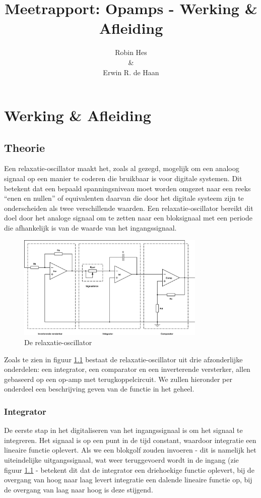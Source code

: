\documentclass{report}
\title{Meetrapport: Opamps - Werking \& Afleiding}
\author{Robin Hes\\\&\\Erwin R. de Haan}
\begin{document}
\chapter{Werking \& Afleiding}

\section{Theorie}
Een relaxatie-oscillator maakt het, zoals al gezegd, mogelijk om een analoog signaal op een manier te coderen die bruikbaar is voor digitale systemen. Dit betekent dat een bepaald spanningsniveau moet worden omgezet naar een reeks ``enen en nullen'' of equivalenten daarvan die door het digitale systeem zijn te onderscheiden als twee verschillende waarden. Een relaxatie-oscillator bereikt dit doel door het analoge signaal om te zetten naar een bloksignaal met een periode die afhankelijk is van de waarde van het ingangssignaal.

\begin{figure}[H]
	\centering
	\includegraphics[width=0.8\textwidth]{relaxatie-oscillator.png}
	\caption{De relaxatie-oscillator}
	\label{fig:rel-os}
\end{figure}

Zoals te zien in figuur \ref{fig:rel-os} bestaat de relaxatie-oscillator uit drie afzonderlijke onderdelen: een integrator, een comparator en een inverterende versterker, allen gebaseerd op een op-amp met terugkoppelcircuit. We zullen hieronder per onderdeel een beschrijving geven van de functie in het geheel.

\subsection{Integrator}

De eerste stap in het digitaliseren van het ingangssignaal is om het signaal te integreren. Het signaal is op een punt in de tijd constant, waardoor integratie een lineaire functie oplevert. Als we een blokgolf zouden invoeren - dit is namelijk het uiteindelijke uitgangssignaal, wat weer teruggevoerd wordt in de ingang (zie figuur \ref{fig:rel-os} -  betekent dit dat de integrator een driehoekige functie oplevert, bij de overgang van hoog naar laag levert integratie een dalende lineaire functie op, bij de overgang van laag naar hoog is deze stijgend.\\
\end{document}
